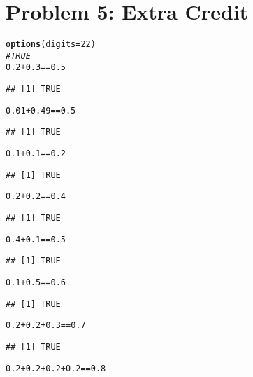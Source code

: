 \documentclass{article}\usepackage[]{graphicx}\usepackage[]{color}
\makeatletter
\newcommand{\hlnum}[1]{\textcolor[rgb]{0.686,0.059,0.569}{#1}}%
\newcommand{\hlcom}[1]{\textcolor[rgb]{0.678,0.584,0.686}{\textit{#1}}}%
\newcommand{\hlopt}[1]{\textcolor[rgb]{0,0,0}{#1}}%
\newcommand{\hlstd}[1]{\textcolor[rgb]{0.345,0.345,0.345}{#1}}%
\newcommand{\hlkwc}[1]{\textcolor[rgb]{0.333,0.667,0.333}{#1}}%
\newcommand{\hlkwd}[1]{\textcolor[rgb]{0.737,0.353,0.396}{\textbf{#1}}}%
\newenvironment{kframe}{%
 \def\at@end@of@kframe{}%
 \ifinner\ifhmode%
  \def\at@end@of@kframe{\end{minipage}}%
  \begin{minipage}{\columnwidth}%
 \fi\fi%
 \def\FrameCommand##1{\hskip\@totalleftmargin \hskip-\fboxsep
 \colorbox{shadecolor}{##1}\hskip-\fboxsep
     \hskip-\linewidth \hskip-\@totalleftmargin \hskip\columnwidth}%
 \MakeFramed {\advance\hsize-\width
   \@totalleftmargin\z@ \linewidth\hsize
   \@setminipage}}%
 {\par\unskip\endMakeFramed%
 \at@end@of@kframe}
\newenvironment{knitrout}{}{} %
\makeatother
\begin{document}
\section{Problem 5: Extra Credit}
\begin{knitrout}
\color{fgcolor}\begin{kframe}
\begin{alltt}
\hlkwd{options}\hlstd{(}\hlkwc{digits} \hlstd{=} \hlnum{22}\hlstd{)}
\hlcom{#TRUE}
\hlnum{0.2} \hlopt{+} \hlnum{0.3} \hlopt{==} \hlnum{0.5}
\end{alltt}
\begin{verbatim}
## [1] TRUE
\end{verbatim}
\begin{alltt}
\hlnum{0.01} \hlopt{+} \hlnum{0.49} \hlopt{==} \hlnum{0.5}
\end{alltt}
\begin{verbatim}
## [1] TRUE
\end{verbatim}
\begin{alltt}
\hlnum{0.1} \hlopt{+} \hlnum{0.1} \hlopt{==} \hlnum{0.2}
\end{alltt}
\begin{verbatim}
## [1] TRUE
\end{verbatim}
\begin{alltt}
\hlnum{0.2} \hlopt{+} \hlnum{0.2} \hlopt{==} \hlnum{0.4}
\end{alltt}
\begin{verbatim}
## [1] TRUE
\end{verbatim}
\begin{alltt}
\hlnum{0.4} \hlopt{+} \hlnum{0.1} \hlopt{==} \hlnum{0.5}
\end{alltt}
\begin{verbatim}
## [1] TRUE
\end{verbatim}
\begin{alltt}
\hlnum{0.1} \hlopt{+} \hlnum{0.5} \hlopt{==} \hlnum{0.6}
\end{alltt}
\begin{verbatim}
## [1] TRUE
\end{verbatim}
\begin{alltt}
\hlnum{0.2} \hlopt{+} \hlnum{0.2} \hlopt{+} \hlnum{0.3} \hlopt{==} \hlnum{0.7}
\end{alltt}
\begin{verbatim}
## [1] TRUE
\end{verbatim}
\begin{alltt}
\hlnum{0.2} \hlopt{+} \hlnum{0.2} \hlopt{+} \hlnum{0.2} \hlopt{+} \hlnum{0.2} \hlopt{==} \hlnum{0.8}

\end{alltt}
\end{kframe}
\end{knitrout}
\end{document}

